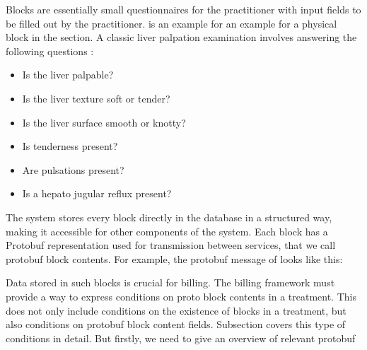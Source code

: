 Blocks are essentially small questionnaires for the practitioner with input fields to be filled out by the practitioner.
 is an example for an example for a physical block in the  section.
A classic liver palpation examination involves answering the following questions \cite{wolf1990evaluation}:
\begin{itemize}
    \item Is the liver palpable?
    \item Is the liver texture soft or tender?
    \item Is the liver surface smooth or knotty?
    \item Is tenderness present?
    \item Are pulsations present?
    \item Is a hepato jugular reflux present?
\end{itemize}


The system stores every block directly in the database in a structured way, making it accessible for other components of the system.
Each block has a Protobuf representation used for transmission between services, that we call protobuf block contents.
For example, the protobuf message of  looks like this:


Data stored in such blocks is crucial for billing.
The billing framework must provide a way to express conditions on proto block contents in a treatment.
This does not only include conditions on the existence of blocks in a treatment, but also conditions on protobuf block content fields.
Subsection \addref covers this type of conditions in detail.
But firstly, we need to give an overview of relevant protobuf

